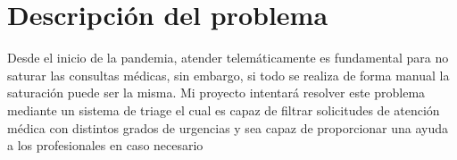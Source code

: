 \chapter{Descripción del problema}
Desde el inicio de la pandemia, atender telemáticamente es fundamental para no saturar las consultas médicas, sin embargo, si todo
se realiza de forma manual la saturación puede ser la misma. Mi proyecto intentará resolver este problema mediante un sistema de
triage el cual es capaz de filtrar solicitudes de atención médica con distintos grados de urgencias y sea capaz de proporcionar
una ayuda a los profesionales en caso necesario
